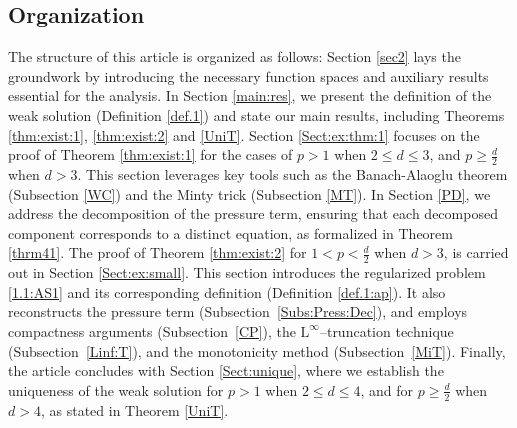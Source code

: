 \documentclass[12pt,reqno]{amsart}
\numberwithin{equation}{section}
\theoremstyle{definition}
\def\L{\mathrm{L}}
\begin{document}
\subsection{Organization}
{The structure of this article is organized as follows:
Section \ref{sec2} lays the groundwork by introducing the necessary function spaces and auxiliary results essential for the analysis.   In Section \ref{main:res}, we present the definition of the weak solution (Definition \ref{def.1}) and state our main results, including Theorems \ref{thm:exist:1}, \ref{thm:exist:2} and \ref{UniT}.
  Section \ref{Sect:ex:thm:1} focuses on the proof of Theorem \ref{thm:exist:1} for the cases of $p>1$ when $2\leq d\leq 3$, {and $p\geq\frac{d}{2}$ when $d>3$. }
  This section leverages key tools such as the Banach-Alaoglu theorem (Subsection \ref{WC}) and the Minty trick (Subsection \ref{MT}).
  In Section \ref{PD}, we address the decomposition of the pressure term, ensuring that each decomposed component corresponds to a distinct equation, as formalized in Theorem \ref{thrm41}.
 The proof of Theorem \ref{thm:exist:2} {for $1<p<\frac{d}{2}$ when $d>3$}, is carried out in Section \ref{Sect:ex:small}.
 This section introduces the regularized problem \eqref{1.1:AS1} and its corresponding definition (Definition \ref{def.1:ap}).
 {It also reconstructs the pressure term (Subsection~\ref{Subs:Press:Dec}), and employs compactness arguments (Subsection~\ref{CP}), the $\L^\infty$--truncation technique (Subsection~\ref{Linf:T}), and the monotonicity method (Subsection~\ref{MiT}).} Finally, the article concludes with Section \ref{Sect:unique}, where we establish the uniqueness of the weak solution for $p>1$ when $2 \leq d\leq 4$, and for  $p\geq \frac{d}{2}$ when $d>4$, as stated in Theorem \ref{UniT}.
}
\end{document}
